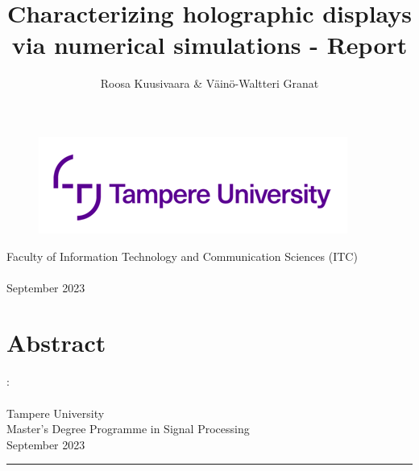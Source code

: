 \documentclass[12pt,a4paper,english
]{tunithesis}
\author{Roosa Kuusivaara \& Väinö-Waltteri Granat}
\title{Characterizing holographic displays via
numerical simulations - Report} %
\begin{document}
\makeatletter

\thispagestyle{empty}
\vspace*{-.5cm}\noindent

\begin{figure}
    \vspace{-1.3cm}
    \advance\leftskip-2.5cm
    \noindent\includegraphics{img/tunilogo.png}
\end{figure}
 
\vspace{2.5cm}
\begin{flushright}
\noindent\textsf{\LARGE{\@author}}

\noindent\vspace{0.5cm}

\noindent\Huge{\textsf{\textbf{\textcolor{tunipurple}{\@title}}}}
\end{flushright}
\vspace{13.7cm} %

\begin{flushright}  
    \begin{spacing}{1.0}
      \textsf{Faculty of Information Technology and Communication Sciences (ITC)\\
      \@thesistype\\
      September 2023}
    \end{spacing}
\end{flushright}

\if@twoside
\clearpage
\fi



\chapter*{Abstract}
\begin{spacing}{1.0}
\noindent \@author: \@title\\
\@thesistype\\
Tampere University\\
Master’s Degree Programme in Signal Processing\\
September 2023
\end{spacing}
\noindent\rule{12cm}{0.4pt}
\end{document}

